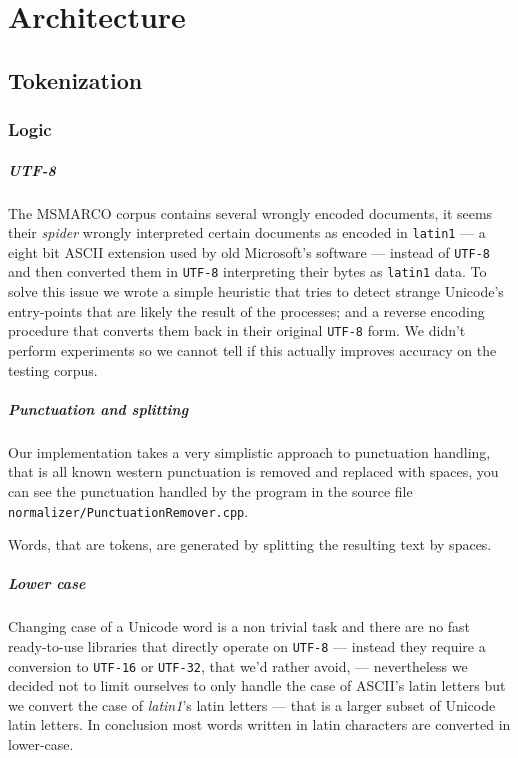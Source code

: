 
\chapter{Architecture}

\section{Tokenization}

\subsection{Logic}

\paragraph{UTF-8} 
The MSMARCO corpus contains several wrongly encoded documents, it seems their \textit{spider} wrongly interpreted certain documents as encoded in \texttt{latin1} --- a eight bit ASCII extension used by old Microsoft's software --- instead of \texttt{UTF-8} and then converted them in \texttt{UTF-8} interpreting their bytes as \texttt{latin1} data. To solve this issue we wrote a simple heuristic that tries to detect strange Unicode's entry-points that are likely the result of the processes; and a reverse encoding procedure that converts them back in their original \texttt{UTF-8} form. We didn't perform experiments so we cannot tell if this actually improves accuracy on the testing corpus.

\paragraph{Punctuation and splitting}
Our implementation takes a very simplistic approach to punctuation handling, that is all known western punctuation is removed and replaced with spaces, you can see the punctuation handled by the program in the source file \texttt{normalizer/PunctuationRemover.cpp}.

Words, that are tokens, are generated by splitting the resulting text by spaces.

\paragraph{Lower case}
Changing case of a Unicode word is a non trivial task and there are no fast ready-to-use libraries that directly operate on \texttt{UTF-8} --- instead they require a conversion to \texttt{UTF-16} or \texttt{UTF-32}, that we'd rather avoid, --- nevertheless we decided not to limit ourselves to only handle the case of ASCII's latin letters but we convert the case of \textit{latin1}'s latin letters --- that is a larger subset of Unicode latin letters. In conclusion most words written in latin characters are converted in lower-case.

